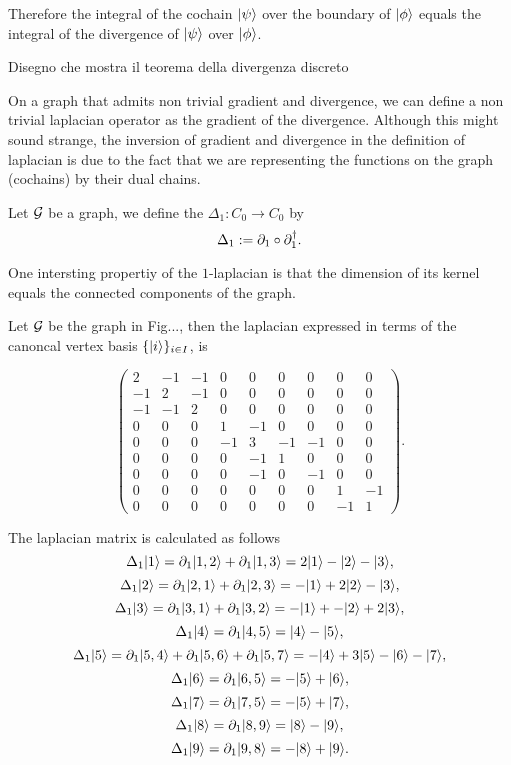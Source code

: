 \documentclass[../2.tex]{subfiles}
\begin{document}
    Therefore the integral of the cochain $| \psi \rangle$ over the boundary of $| \phi \rangle$ equals the integral of the divergence of $| \psi \rangle$ over $| \phi \rangle$.

    {\color{red} Disegno che mostra il teorema della divergenza discreto}

    On a graph that admits non trivial gradient and divergence, we can define a non trivial laplacian operator as the gradient of the divergence.
    Although this might sound strange, the inversion of gradient and divergence in the definition of laplacian is due to the fact that we are representing
    the functions on the graph (cochains) by their dual chains.

    \begin{defn}
        Let $\mathcal{G}$ be a graph, we define the  $\Delta_1 : C_0 \to C_0$ by 
        \[ \Delta_1 := \partial_1 \circ \partial^\dagger_1.\]
    \end{defn}

    One intersting propertiy of the $1$-laplacian is that the dimension of its kernel equals the connected components of the graph.

    Let $\mathcal{G}$ be the graph  in Fig..., then the laplacian expressed in terms of the canoncal vertex basis $\{| i \rangle\}_{i \in I}$, is

    \[\begin{pmatrix}
            2 & -1 & -1 & 0 & 0 & 0 & 0 & 0 & 0 \\
            -1 & 2 & -1 & 0 & 0 & 0 & 0 & 0 & 0 \\
            -1 & -1 & 2 & 0 & 0 & 0 & 0 & 0 & 0 \\
            0 & 0 & 0 & 1 & -1 & 0 & 0 & 0 & 0 \\
            0 & 0 & 0 & -1 & 3 & -1 & -1 & 0 & 0 \\
            0 & 0 & 0 & 0 & -1 & 1 & 0 & 0 & 0 \\
            0 & 0 & 0 & 0 & -1 & 0 & -1 & 0 & 0 \\
            0 & 0 & 0 & 0 & 0 & 0 & 0 & 1 & -1 \\
            0 & 0 & 0 & 0 & 0 & 0 & 0 & -1 & 1 
        \end{pmatrix}. \] 

    The laplacian matrix is calculated as follows
    \[ \Delta_1 | 1 \rangle = \partial_1| 1,2 \rangle + \partial_1| 1,3 \rangle = 2| 1 \rangle-| 2 \rangle-| 3 \rangle,\]
    \[ \Delta_1 | 2 \rangle = \partial_1| 2,1 \rangle + \partial_1| 2,3 \rangle = -| 1 \rangle+2| 2 \rangle-| 3 \rangle,\]
    \[ \Delta_1 | 3 \rangle = \partial_1| 3,1 \rangle + \partial_1| 3,2 \rangle = -| 1 \rangle+-| 2 \rangle+2| 3 \rangle,\]
    \[ \Delta_1 | 4 \rangle = \partial_1| 4,5 \rangle = | 4 \rangle-| 5 \rangle,\]
    \[ \Delta_1 | 5 \rangle = \partial_1| 5,4 \rangle+\partial_1| 5,6 \rangle+\partial_1| 5,7 \rangle = -| 4 \rangle+3| 5 \rangle-| 6 \rangle-| 7 \rangle,\]
    \[ \Delta_1 | 6 \rangle = \partial_1| 6,5 \rangle = -| 5 \rangle+| 6 \rangle,\]
    \[ \Delta_1 | 7 \rangle = \partial_1| 7,5 \rangle = -| 5 \rangle+| 7 \rangle,\]
    \[ \Delta_1 | 8 \rangle = \partial_1| 8,9 \rangle = | 8 \rangle-| 9 \rangle,\]
    \[ \Delta_1 | 9 \rangle = \partial_1| 9,8 \rangle = -| 8 \rangle+| 9 \rangle.\] 
\end{document}
